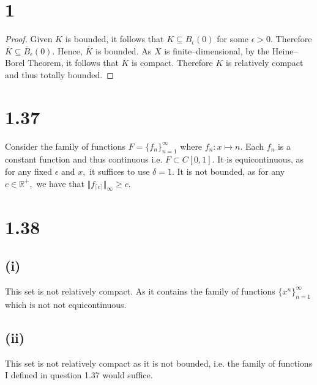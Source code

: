 \documentclass[10pt]{article}
\begin{document}
\section*{1}

\begin{proof}
    Given $K$ is bounded, it follows that $K\subseteq B_\epsilon(0)$ for some $\epsilon>0.$ Therefore $\overline{K}\subseteq \overline{B}_\epsilon(0).$ 
    Hence, $\overline{K}$ is bounded. As $X$ is finite--dimensional, by the Heine--Borel Theorem, it follows that $\overline{K}$ is compact. Therefore $K$ is relatively compact and thus totally bounded.
\end{proof}

\section*{1.37}

Consider the family of functions $F = \{f_n\}_{n=1}^\infty$ where $f_n : x\mapsto n.$ Each $f_n$ is a constant function and thus continuous i.e. $F \subset C[0,1].$ It is equicontinuous, as for any fixed $\epsilon$ and $x,$ it suffices to use $\delta = 1.$ It is not bounded, as for any $c \in \mathbb{R}^+,$ we have that $\Vert f_{\lceil c\rceil}\Vert_\infty \ge c.$

\section*{1.38}

\subsection*{(i)} This set is not relatively compact. As it contains the family of functions $\{x^n\}_{n=1}^\infty$ which is not not equicontinuous.

\subsection*{(ii)} This set is not relatively compact as it is not bounded, i.e. the family of functions I defined in question 1.37 would suffice.
\end{document}
